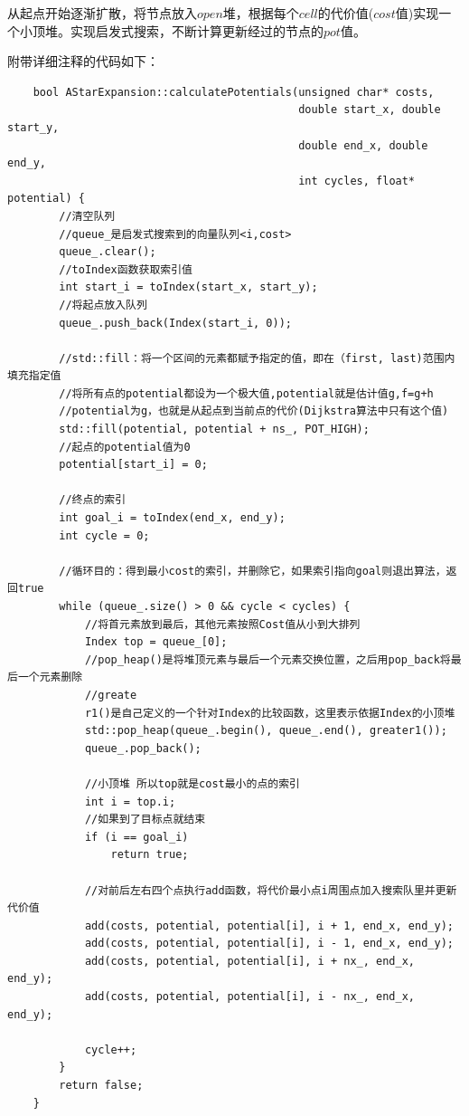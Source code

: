 \documentclass[9pt, oneside]{book}
\begin{document}
从起点开始逐渐扩散，将节点放入$open$堆，根据每个$cell$的代价值($cost$值)实现一个小顶堆。实现启发式搜索，不断计算更新经过的节点的$pot$值。

附带详细注释的代码如下：

\small
\begin{verbatim}
    bool AStarExpansion::calculatePotentials(unsigned char* costs, 
                                             double start_x, double start_y, 
                                             double end_x, double end_y,
                                             int cycles, float* potential) {
        //清空队列
        //queue_是启发式搜索到的向量队列<i,cost>
        queue_.clear();
        //toIndex函数获取索引值
        int start_i = toIndex(start_x, start_y);
        //将起点放入队列
        queue_.push_back(Index(start_i, 0));

        //std::fill：将一个区间的元素都赋予指定的值，即在（first, last)范围内填充指定值
        //将所有点的potential都设为一个极大值,potential就是估计值g,f=g+h
        //potential为g，也就是从起点到当前点的代价(Dijkstra算法中只有这个值)
        std::fill(potential, potential + ns_, POT_HIGH);
        //起点的potential值为0
        potential[start_i] = 0;

        //终点的索引
        int goal_i = toIndex(end_x, end_y);
        int cycle = 0;

        //循环目的：得到最小cost的索引，并删除它，如果索引指向goal则退出算法，返回true
        while (queue_.size() > 0 && cycle < cycles) {
            //将首元素放到最后，其他元素按照Cost值从小到大排列
            Index top = queue_[0];
            //pop_heap()是将堆顶元素与最后一个元素交换位置，之后用pop_back将最后一个元素删除
            //greate    
            r1()是自己定义的一个针对Index的比较函数，这里表示依据Index的小顶堆
            std::pop_heap(queue_.begin(), queue_.end(), greater1());
            queue_.pop_back();

            //小顶堆 所以top就是cost最小的点的索引
            int i = top.i;
            //如果到了目标点就结束
            if (i == goal_i)
                return true;

            //对前后左右四个点执行add函数，将代价最小点i周围点加入搜索队里并更新代价值
            add(costs, potential, potential[i], i + 1, end_x, end_y);
            add(costs, potential, potential[i], i - 1, end_x, end_y);
            add(costs, potential, potential[i], i + nx_, end_x, end_y);
            add(costs, potential, potential[i], i - nx_, end_x, end_y);

            cycle++;
        }
        return false;
    }
\end{verbatim}
\normalsize
\end{document}

